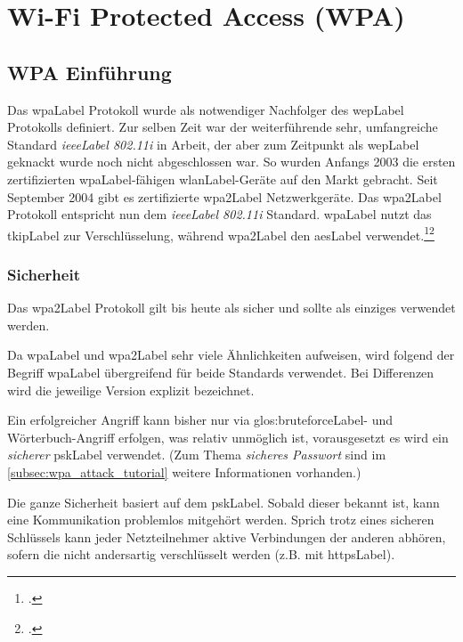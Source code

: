 \chapter{Wi-Fi Protected Access (WPA)}
\label{ch:wpa}

\section{WPA Einführung}
Das \gls{wpaLabel} Protokoll wurde als notwendiger Nachfolger des \gls{wepLabel} Protokolls definiert.
Zur selben Zeit war der weiterführende sehr, umfangreiche Standard \textit{\gls{ieeeLabel} 802.11i} in Arbeit, der aber zum Zeitpunkt als \gls{wepLabel} geknackt wurde noch nicht abgeschlossen war.
So wurden Anfangs 2003 die ersten zertifizierten \gls{wpaLabel}-fähigen \gls{wlanLabel}-Geräte auf den Markt gebracht.
Seit September 2004 gibt es zertifizierte \gls{wpa2Label} Netzwerkgeräte. Das \gls{wpa2Label} Protokoll entspricht nun dem \textit{\gls{ieeeLabel} 802.11i} Standard.
\gls{wpaLabel} nutzt das \gls{tkipLabel} zur Verschlüsselung, während \gls{wpa2Label} den \gls{aesLabel} verwendet.\footcite{Wi-Fi_Protected_Access__Wikipedia_2015-04-10}\footcite{WPA2__Wikipedia_2015-04-10}

\subsection{Sicherheit}
Das \gls{wpa2Label} Protokoll gilt bis heute als sicher und sollte als einziges verwendet werden.

Da \gls{wpaLabel} und \gls{wpa2Label} sehr viele Ähnlichkeiten aufweisen, wird folgend der Begriff \gls{wpaLabel} übergreifend für beide Standards verwendet. Bei Differenzen wird die jeweilige Version explizit bezeichnet.

Ein erfolgreicher Angriff kann bisher nur via \gls{glos:bruteforceLabel}- und Wörterbuch-Angriff erfolgen, was relativ unmöglich ist, vorausgesetzt es wird ein \textit{sicherer} \gls{pskLabel} verwendet. (Zum Thema \textit{sicheres Passwort} sind im \cref{subsec:wpa_attack_tutorial} weitere Informationen vorhanden.)


Die ganze Sicherheit basiert auf dem \gls{pskLabel}.
Sobald dieser bekannt ist, kann eine Kommunikation problemlos mitgehört werden.
Sprich trotz eines sicheren Schlüssels kann jeder Netzteilnehmer aktive Verbindungen der anderen abhören, sofern die nicht andersartig verschlüsselt werden (z.B. mit \gls{httpsLabel}).


